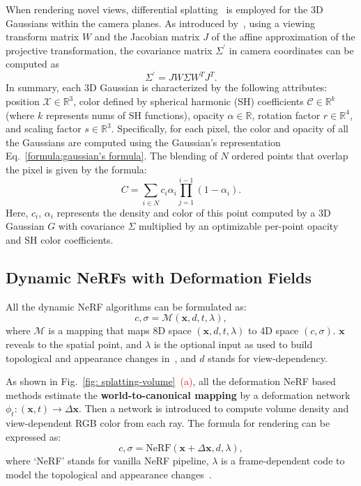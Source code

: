 \documentclass[10pt,twocolumn,letterpaper]{article}
\begin{document}
When rendering novel views, differential splatting~\cite{yifan2019differentiablesplatting} is employed for the 3D Gaussians within the camera planes. As introduced by~\cite{zwicker2001surfacesplatting}, using a viewing transform matrix $W$ and the Jacobian matrix $J$ of the affine approximation of the projective transformation, the covariance matrix $\Sigma^{\prime}$ in camera coordinates can be computed as
\begin{equation}
    \Sigma^{\prime} = JW\Sigma W^TJ^T.
\end{equation}
In summary, each 3D Gaussian is characterized by the following attributes: position $\mathcal{X} \in \mathbb{R}^3$, color defined by spherical harmonic (SH) coefficients $\mathcal{C} \in \mathbb{R}^k$ (where $k$ represents nums of SH functions), opacity $\alpha \in \mathbb{R}$, rotation factor $r \in \mathbb{R}^4$, and scaling factor $s \in \mathbb{R}^3$.
Specifically, for each pixel, the color and opacity of all the Gaussians are computed using the Gaussian's representation Eq.~\ref{formula:gaussian's formula}. The blending of $N$ ordered points that overlap the pixel is given by the formula:
\begin{equation}
\label{formula: splatting&volume rendering}
    C = \sum_{i\in N}c_i \alpha_i \prod_{j=1}^{i-1} (1-\alpha_i).
\end{equation}
Here, $c_i$, $\alpha_i$ represents the density and color of this point computed by a 3D Gaussian $G$ with covariance $\Sigma$ multiplied by an optimizable per-point opacity and SH color coefficients.

\subsection{Dynamic NeRFs with Deformation Fields}
\label{subsec:Dynamic NeRFs with deformation Fields.}
All the dynamic NeRF algorithms can be formulated as:
\begin{equation}
    c,\sigma = \mathcal{M}(\mathbf{x},d,t,\lambda),
\end{equation}
where $\mathcal{M}$ is a mapping that maps 8D space $(\mathbf{x},d,t,\lambda)$ to 4D space $(c,\sigma)$. $\mathbf{x}$ reveals to the spatial point, and $\lambda$ is the optional input as used to build topological and appearance changes in~\cite{park2021hypernerf}, and $d$ stands for view-dependency.

As shown in Fig.~\ref{fig: splatting-volume}~\textcolor{red}{(a)}, all the deformation NeRF based methods estimate the \textbf{world-to-canonical mapping} by a deformation network $\phi_t:(\mathbf{x},t)\rightarrow \Delta \mathbf{x}$. Then a network is introduced to compute volume density and view-dependent RGB color from each ray. The formula for rendering can be expressed as:
\begin{equation}
    c, \sigma = \text{NeRF}(\mathbf{x}+\Delta \mathbf{x},d,\lambda),
\end{equation}
where `NeRF' stands for vanilla NeRF pipeline, $\lambda$ is a frame-dependent code to model the topological and appearance changes~\cite{park2021hypernerf,martin2021nerf}.
\end{document}

